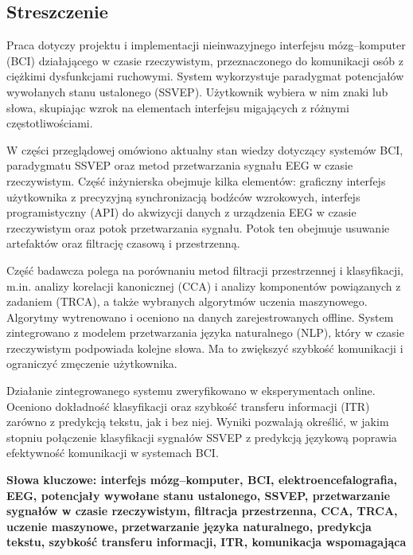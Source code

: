 \begin{otherlanguage}{polish}
\chapter*{Streszczenie}

Praca dotyczy projektu i implementacji nieinwazyjnego interfejsu mózg–komputer (BCI) działającego w czasie rzeczywistym, przeznaczonego do komunikacji osób z ciężkimi dysfunkcjami ruchowymi. System wykorzystuje paradygmat potencjałów wywołanych stanu ustalonego (SSVEP). Użytkownik wybiera w nim znaki lub słowa, skupiając wzrok na elementach interfejsu migających z różnymi częstotliwościami.

W części przeglądowej omówiono aktualny stan wiedzy dotyczący systemów BCI, paradygmatu SSVEP oraz metod przetwarzania sygnału EEG w czasie rzeczywistym. Część inżynierska obejmuje kilka elementów: graficzny interfejs użytkownika z precyzyjną synchronizacją bodźców wzrokowych, interfejs programistyczny (API) do akwizycji danych z urządzenia EEG w czasie rzeczywistym oraz potok przetwarzania sygnału. Potok ten obejmuje usuwanie artefaktów oraz filtrację czasową i przestrzenną.

Część badawcza polega na porównaniu metod filtracji przestrzennej i klasyfikacji, m.in. analizy korelacji kanonicznej (CCA) i analizy komponentów powiązanych z zadaniem (TRCA), a także wybranych algorytmów uczenia maszynowego. Algorytmy wytrenowano i oceniono na danych zarejestrowanych offline. System zintegrowano z modelem przetwarzania języka naturalnego (NLP), który w czasie rzeczywistym podpowiada kolejne słowa. Ma to zwiększyć szybkość komunikacji i ograniczyć zmęczenie użytkownika.

Działanie zintegrowanego systemu zweryfikowano w eksperymentach online. Oceniono dokładność klasyfikacji oraz szybkość transferu informacji (ITR) zarówno z predykcją tekstu, jak i bez niej. Wyniki pozwalają określić, w jakim stopniu połączenie klasyfikacji sygnałów SSVEP z predykcją językową poprawia efektywność komunikacji w systemach BCI. 

\bigskip
\noindent\textbf{Słowa kluczowe: interfejs mózg–komputer, BCI, elektroencefalografia, EEG, potencjały wywołane stanu ustalonego, SSVEP, przetwarzanie sygnałów w czasie rzeczywistym, filtracja przestrzenna, CCA, TRCA, uczenie maszynowe, przetwarzanie języka naturalnego, predykcja tekstu, szybkość transferu informacji, ITR, komunikacja wspomagająca }
\end{otherlanguage}

